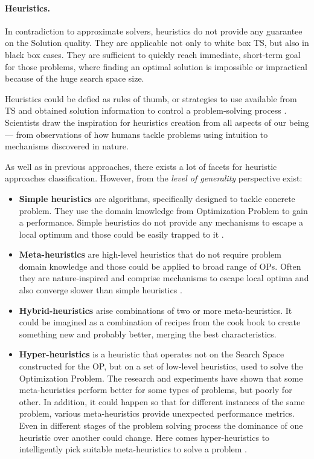 \paragraph{Heuristics.} In contradiction to approximate solvers, heuristics do not provide any guarantee on the Solution quality. They are applicable not only to white box TS, but also in black box cases. They are sufficient to quickly reach immediate, short-term goal for those problems, where finding an optimal solution is impossible or impractical because of the huge search space size.

Heuristics could be defied as rules of thumb, or strategies to use available from TS and obtained solution information to control a problem-solving process \cite{pearl1984intelligent}. Scientists draw the inspiration for heuristics creation from all aspects of our being — from observations of how humans tackle problems using intuition to mechanisms discovered in nature.


As well as in previous approaches, there exists a lot of facets for heuristic approaches classification.
However, from the \textit{level of generality} perspective exist:
\begin{itemize}
	\item \textbf{Simple heuristics} are algorithms, specifically designed to tackle concrete problem. They use the domain knowledge from Optimization Problem to gain a performance. Simple heuristics do not provide any mechanisms to escape a local optimum and those could be easily trapped to it \cite{pearl1984intelligent}.
	
	\item \textbf{Meta-heuristics} are high-level heuristics that do not require problem domain knowledge and those could be applied to broad range of OPs. Often they are nature-inspired and comprise mechanisms to escape local optima and also converge slower than simple heuristics \cite{bianchi2009survey}.
	
	\item \textbf{Hybrid-heuristics} arise combinations of two or more meta-heuristics. It could be imagined as a combination of recipes from the cook book to create something new and probably better, merging the best characteristics.
	
	\item \textbf{Hyper-heuristics} is a heuristic that operates not on the Search Space constructed for the OP, but on a set of low-level heuristics, used to solve the Optimization Problem. The research and experiments have shown that some meta-heuristics perform better for some types of problems, but poorly for other. In addition, it could happen so that for different instances of the same problem, various meta-heuristics provide unexpected performance metrics. Even in different stages of the problem solving process the dominance of one heuristic over another could change. Here comes hyper-heuristics to intelligently pick suitable meta-heuristics to solve a problem \cite{burke2003hyper}.
\end{itemize}

